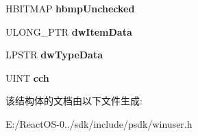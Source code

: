 \begin{DoxyCompactItemize}
H\+B\+I\+T\+M\+AP {\bfseries hbmp\+Unchecked}
\item 
\mbox{\label{structtag_m_e_n_u_i_t_e_m_i_n_f_o_a_a69d7a8866329ac63e5c311c2ecc2f33e}} 
U\+L\+O\+N\+G\+\_\+\+P\+TR {\bfseries dw\+Item\+Data}
\item 
\mbox{\label{structtag_m_e_n_u_i_t_e_m_i_n_f_o_a_a5ddea0d2a51098b83c8bca74e90e5ad0}} 
L\+P\+S\+TR {\bfseries dw\+Type\+Data}
\item 
\mbox{\label{structtag_m_e_n_u_i_t_e_m_i_n_f_o_a_a4af40db65d8c4fd6f60d023559185691}} 
U\+I\+NT {\bfseries cch}
\end{DoxyCompactItemize}


该结构体的文档由以下文件生成\+:\begin{DoxyCompactItemize}
\item 
E\+:/\+React\+O\+S-\/0../sdk/include/psdk/winuser.\+h\end{DoxyCompactItemize}
